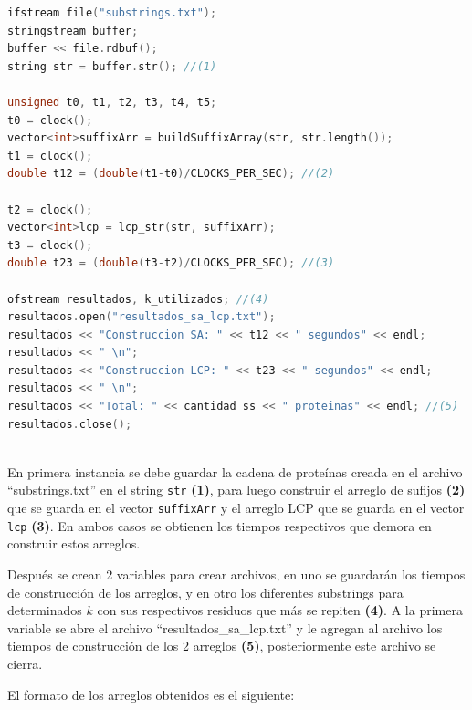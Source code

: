 \begin{lstlisting}[language=C++, caption=Obtención de los arreglos SA y LCP para la cadena de proteínas.]
ifstream file("substrings.txt");
stringstream buffer;
buffer << file.rdbuf();
string str = buffer.str(); //(1)

unsigned t0, t1, t2, t3, t4, t5;
t0 = clock();
vector<int>suffixArr = buildSuffixArray(str, str.length());
t1 = clock();
double t12 = (double(t1-t0)/CLOCKS_PER_SEC); //(2)

t2 = clock();
vector<int>lcp = lcp_str(str, suffixArr);
t3 = clock();
double t23 = (double(t3-t2)/CLOCKS_PER_SEC); //(3)

ofstream resultados, k_utilizados; //(4)
resultados.open("resultados_sa_lcp.txt");
resultados << "Construccion SA: " << t12 << " segundos" << endl;
resultados << " \n";
resultados << "Construccion LCP: " << t23 << " segundos" << endl;
resultados << " \n";
resultados << "Total: " << cantidad_ss << " proteinas" << endl; //(5)
resultados.close();
	
\end{lstlisting}

En primera instancia se debe guardar la cadena de proteínas creada en el archivo ``substrings.txt'' en el string \texttt{str} \textbf{(1)}, para luego construir el arreglo de sufijos \textbf{(2)} que se guarda en el vector \texttt{suffixArr} y el arreglo LCP que se guarda en el vector \texttt{lcp} \textbf{(3)}. En ambos casos se obtienen los tiempos respectivos que demora en construir estos arreglos.

Después se crean 2 variables para crear archivos, en uno se guardarán los tiempos de construcción de los arreglos, y en otro los diferentes substrings para determinados $k$ con sus respectivos residuos que más se repiten \textbf{(4)}. A la primera variable se abre el archivo ``resultados\_sa\_lcp.txt'' y le agregan al archivo los tiempos de construcción de los 2 arreglos \textbf{(5)}, posteriormente este archivo se cierra.

El formato de los arreglos obtenidos es el siguiente:


